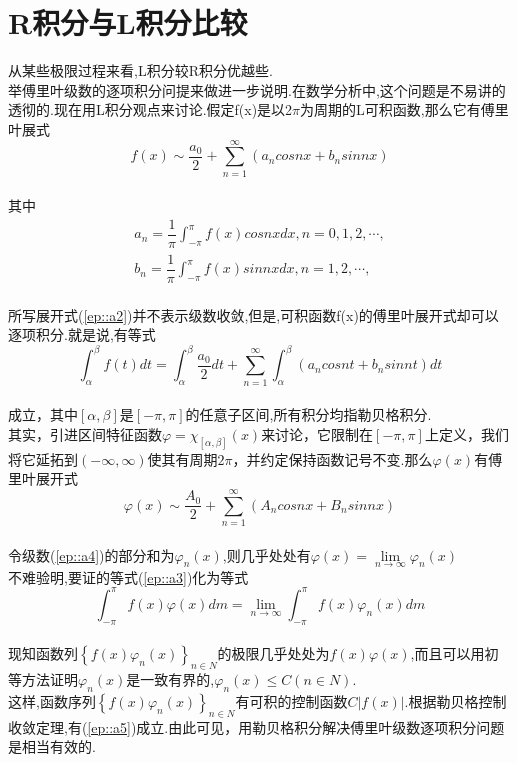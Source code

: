 \documentclass{ctexart}
\begin{document}
\section{R积分与L积分比较}
从某些极限过程来看,L积分较R积分优越些.\\
举傅里叶级数的逐项积分问提来做进一步说明.在数学分析中,这个问题是不易讲的透彻的.现在用L积分观点来讨论.假定f(x)是以2$\pi$为周期的L可积函数,那么它有傅里叶展式\\
\begin{equation}\label{ep::a2}
f(x)\sim\dfrac{a_0}{2}+\sum\limits_{n=1}^{\infty}(a_ncosnx+b_nsinnx)
\end{equation}\\
其中\\
\begin{gather*}
  a_n=\dfrac{1}{\pi}\int_{-\pi}^{\pi}f(x)cosnxdx, n=0,1,2,\cdots,\\
  b_n=\dfrac{1}{\pi}\int_{-\pi}^{\pi}f(x)sinnxdx, n=1,2,\cdots,
\end{gather*}\\
所写展开式(\ref{ep::a2})并不表示级数收敛,但是,可积函数f(x)的傅里叶展开式却可以逐项积分.就是说,有等式\\
\begin{equation}\label{ep::a3}
\int_{\alpha}^{\beta}f(t)dt=\int_{\alpha}^{\beta}\dfrac{a_0}{2}dt+\sum\limits_{n=1}^{\infty}\int_{\alpha}^{\beta}(a_ncosnt+b_nsinnt)dt
\end{equation}\\
成立，其中$[\alpha,\beta]$是$[-\pi,\pi]$的任意子区间,所有积分均指勒贝格积分.\\
其实，引进区间特征函数$\varphi=\chi_{[\alpha,\beta]}(x)$来讨论，它限制在$[-\pi,\pi]$上定义，我们将它延拓到$(-\infty,\infty)$使其有周期$2\pi$，并约定保持函数记号不变.那么$\varphi(x)$有傅里叶展开式\\
\begin{equation}\label{ep::a4}
\varphi(x)\sim\dfrac{A_0}{2}+\sum\limits_{n=1}^{\infty}(A_ncosnx+B_nsinnx)
\end{equation}\\

令级数(\ref{ep::a4})的部分和为$\varphi_n(x)$,则几乎处处有$\varphi(x)=\lim\limits_{n \rightarrow \infty}\varphi_n(x)$\\
不难验明,要证的等式(\ref{ep::a3})化为等式\\
\begin{equation}\label{ep::a5}
\int_{-\pi}^{\pi}f(x)\varphi(x)dm=\lim\limits_{n \rightarrow\infty}\int_{-\pi}^{\pi}f(x)\varphi_{n}(x)dm
\end{equation}\\
现知函数列$\left\{f(x)\varphi_{n}(x)\right\}_{n \in N}$的极限几乎处处为$f(x)\varphi(x)$,而且可以用初等方法证明$\varphi_{n}(x)$是一致有界的,$\varphi_{n}(x)\le C(n \in N)$.\\

这样,函数序列$\left\{f(x)\varphi_{n}(x)\right\}_{n \in N}$有可积的控制函数$C|f(x)|$.根据勒贝格控制收敛定理,有(\ref{ep::a5})成立.由此可见，用勒贝格积分解决傅里叶级数逐项积分问题是相当有效的.
\end{document}
